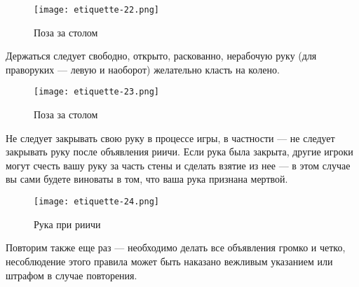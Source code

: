 \begin{figure}[H]
	\centering
	\texttt{[image: etiquette-22.png]}
	\caption{Поза за столом}
\end{figure}

Держаться следует свободно, открыто, раскованно, нерабочую руку (для праворуких — левую и наоборот) желательно класть на колено.

\begin{figure}[H]
	\centering
	\texttt{[image: etiquette-23.png]}
	\caption{Поза за столом}
\end{figure}

Не следует закрывать свою руку в процессе игры, в частности --- не следует закрывать руку после объявления риичи. Если рука была закрыта, другие игроки могут счесть вашу руку за часть стены и сделать взятие из нее --- в этом случае вы сами будете виноваты в том, что ваша рука признана мертвой.

\begin{figure}[H]
	\centering
	\texttt{[image: etiquette-24.png]}
	\caption{Рука при риичи}
\end{figure}

Повторим также еще раз --- необходимо делать все объявления громко и четко, несоблюдение этого правила может быть наказано вежливым указанием или штрафом в случае повторения.
